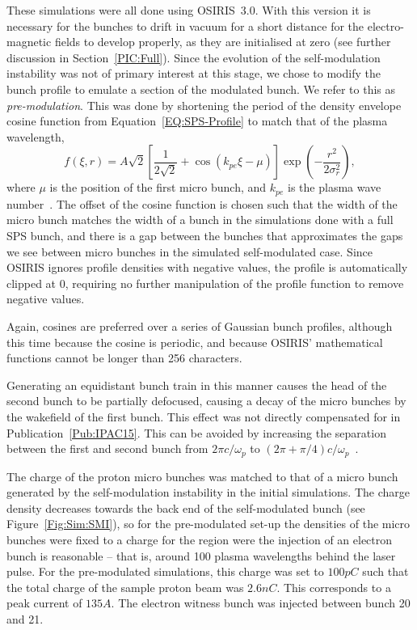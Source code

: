 These simulations were all done using OSIRIS~3.0.
With this version it is necessary for the bunches to drift in vacuum for a short distance for the electro-magnetic fields to develop properly, as they are initialised at zero (see further discussion in Section~\ref{PIC:Full}).
Since the evolution of the self-modulation instability was not of primary interest at this stage, we chose to modify the bunch profile to emulate a section of the modulated bunch.
We refer to this as \textit{pre-modulation}.
This was done by shortening the period of the density envelope cosine function from Equation~\ref{EQ:SPS-Profile} to match that of the plasma wavelength,
\begin{equation}
    f(\xi,r) = A\sqrt{2} \left[\frac{1}{2\sqrt{2}}
             + \cos\left(k_{pe}\xi - \mu\right)\right] \exp\left(-\frac{r^{2}}{2\sigma_{r}^{2}}\right), \label{EQ:PB-PreMod}
\end{equation}
where $\mu$ is the position of the first micro bunch, and $k_{pe}$ is the plasma wave number~\cite{berglyd_olsen:2015}.
The offset of the cosine function is chosen such that the width of the micro bunch matches the width of a bunch in the simulations done with a full SPS bunch, and there is a gap between the bunches that approximates the gaps we see between micro bunches in the simulated self-modulated case.
Since OSIRIS ignores profile densities with negative values, the profile is automatically clipped at $0$, requiring no further manipulation of the profile function to remove negative values.

Again, cosines are preferred over a series of Gaussian bunch profiles, although this time because the cosine is periodic, and because OSIRIS' mathematical functions cannot be longer than 256 characters.

Generating an equidistant bunch train in this manner causes the head of the second bunch to be partially defocused, causing a decay of the micro bunches by the wakefield of the first bunch.
This effect was not directly compensated for in Publication~\ref{Pub:IPAC15}.
This can be avoided by increasing the separation between the first and second bunch from $2\pi c/\omega_p$ to $(2\pi+\pi/4) c/\omega_p$~\cite{lotov:2018}.

The charge of the proton micro bunches was matched to that of a micro bunch generated by the self-modulation instability in the initial simulations.
The charge density decreases towards the back end of the self-modulated bunch (see Figure~\ref{Fig:Sim:SMI}), so for the pre-modulated set-up the densities of the micro bunches were fixed to a charge for the region were the injection of an electron bunch is reasonable -- that is, around 100 plasma wavelengths behind the laser pulse.
For the pre-modulated simulations, this charge was set to $100\unit{pC}$ such that the total charge of the sample proton beam was $2.6\unit{nC}$.
This corresponds to a peak current of $135\unit{A}$.
The electron witness bunch was injected between bunch 20 and 21.


